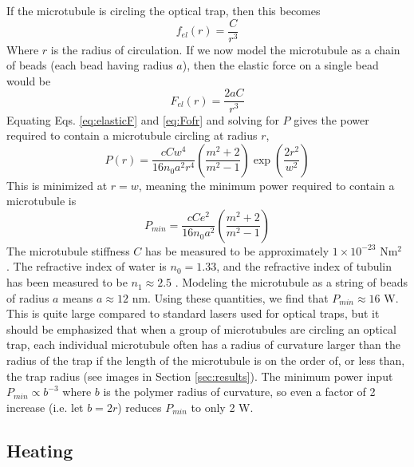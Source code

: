 \documentclass[11pt]{ucthesis}
\begin{document}
If the microtubule is circling the optical trap, then this becomes
\begin{equation}
\label{eq:elasticf}
f_{el}(r) = \frac{C}{r^3}
\end{equation}
Where $r$ is the radius of circulation. If we now model the microtubule as a chain of beads (each bead having radius $a$), then the elastic force on a single bead would be
\begin{equation}
\label{eq:elasticF}
F_{el}(r) = \frac{2aC}{r^3}
\end{equation}
Equating Eqs. \ref{eq:elasticF} and \ref{eq:Fofr} and solving for $P$ gives the power required to contain a microtubule circling at radius $r$,
\begin{equation}
\label{eq:Pofr}
P(r) = \frac{cC w^4}{16n_0 a^2r^4}\left(\frac{m^2+2}{m^2-1}\right)\exp\left(\frac{2r^2}{w^2}\right)
\end{equation}
This is minimized at $r=w$, meaning the minimum power required to contain a microtubule is 
\begin{equation}
\label{eq:Pmin}
P_{min} = \frac{cCe^2}{16n_0 a^2}\left(\frac{m^2+2}{m^2-1}\right)
\end{equation}
The microtubule stiffness $C$ has be measured to be approximately $1\times10^{-23}$ Nm$^2$ \cite{gittes1993flexural,felgner1996flexural}. The refractive index of water is $n_0 = 1.33$, and the refractive index of tubulin has been measured to be $n_1\approx 2.5$ \cite{bon2014fast,mershin2004tubulin}. Modeling the microtubule as a string of beads of radius $a$ means $a\approx 12$ nm. Using these quantities, we find that $P_{min} \approx 16$ W. This is quite large compared to standard lasers used for optical traps, but it should be emphasized that when a group of microtubules are circling an optical trap, each individual microtubule often has a radius of curvature larger than the radius of the trap if the length of the microtubule is on the order of, or less than, the trap radius (see images in Section \ref{sec:results}). The minimum power input $P_{min}\propto b^{-3}$ where $b$ is the polymer radius of curvature, so even a factor of 2 increase (i.e. let $b=2r$) reduces $P_{min}$ to only 2 W.

\subsection{Heating}
\end{document}
